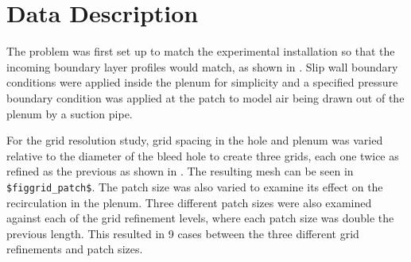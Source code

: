 
\section{Data Description}


The problem was first set up to match the experimental installation so that the incoming boundary layer profiles would match, as shown in . Slip wall boundary conditions were applied inside the plenum for simplicity and a specified pressure boundary condition was applied at the patch to model air being drawn out of the plenum by a suction pipe.

\figSmallPatch
\figMeshOverlay


For the grid resolution study, grid spacing in the hole and plenum was varied relative to the diameter of the bleed hole to create three grids, each one twice as refined as the previous as shown in . The resulting mesh can be seen in \verb|$figgrid_patch$|. The patch size was also varied to examine its effect on the recirculation in the plenum. Three different patch sizes were also examined against each of the grid refinement levels, where each patch size was double the previous length. This resulted in 9 cases between the three different grid refinements and patch sizes.



